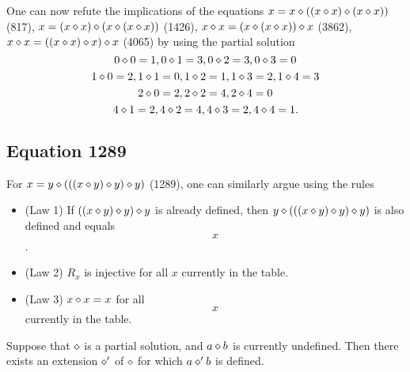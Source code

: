 One can now refute the implications of the equations $x = x \diamond ((x \diamond x) \diamond (x \diamond x))$ (817), $x = (x \diamond x) \diamond (x \diamond (x \diamond x))$ (1426), $x \diamond x = (x \diamond (x \diamond x)) \diamond x$ (3862), $x \diamond x = ((x \diamond x) \diamond x) \diamond x$ (4065) by using the partial solution
$$ 0 \diamond 0 = 1, 0 \diamond 1 = 3, 0 \diamond 2 = 3, 0 \diamond 3 = 0$$
$$1\diamond 0 = 2, 1 \diamond 1 = 0, 1 \diamond 2 = 1, 1 \diamond 3 =2 , 1 \diamond 4 = 3$$
$$ 2 \diamond 0 = 2, 2 \diamond 2 = 4, 2 \diamond 4 = 0$$
$$ 4 \diamond 1 = 2, 4 \diamond 2 = 4, 4 \diamond 3 = 2, 4 \diamond 4 = 1.$$

\subsection{Equation 1289}

For $x = y \diamond (((x \diamond y) \diamond y) \diamond y)$ (1289), one can similarly argue using the rules
\begin{itemize}
\item (Law 1) If $((x \diamond y) \diamond y) \diamond y$ is already defined, then $y \diamond (((x \diamond y) \diamond y) \diamond y)$ is also defined and equals $$x$$.
\item (Law 2) $R_x$ is injective for all $x$ currently in the table.
\item (Law 3) $x\diamond x=x$ for all $$x$$ currently in the table.
\end{itemize}

\begin{lemma}[1289 extension]\label{1289-extension}  Suppose that $\diamond$ is a partial solution, and $a \diamond b$ is currently undefined.  Then there exists an extension $\diamond'$ of $\diamond$ for which $a \diamond' b$ is defined.
\end{lemma}

